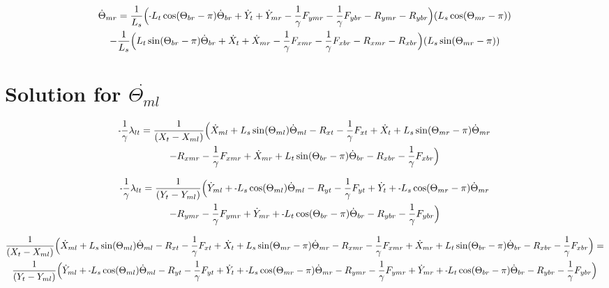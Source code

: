 \documentclass[11pt, landscape]{article}
\newcommand{\mn}{\scalebox{0.7}[1.0]{-}}
\begin{document}
\begin{multline}
\dot{\Theta}_{mr} =
\frac{1}{L_{s}} \Big( \mn L_{t}\cos(\Theta_{br}-\pi) \dot{\Theta}_{br} + \dot{Y}_{t }  + \dot{Y}_{mr} - \frac{1}{\gamma}F_{ymr} - \frac{1}{\gamma}F_{ybr} - R_{ymr} - R_{ybr} \Big) (L_{s}\cos(\Theta_{mr}-\pi))\\
  - \frac{1}{L_{s}}\Big(L_{t}\sin(\Theta_{br}-\pi) \dot{\Theta}_{br} + \dot{X}_{t } + \dot{X}_{mr} - \frac{1}{\gamma}F_{xmr} - \frac{1}{\gamma}F_{xbr} - R_{xmr} - R_{xbr} \Big)(L_{s}\sin(\Theta_{mr}-\pi))
\end{multline}



\section{Solution for $\dot{\Theta_{ml}}$}

\begin{multline}
\mn\frac{1}{\gamma}\lambda_{lt} =
\frac{1}{(X_{t } - X_{ml})} \Big( \dot{X}_{ml} + L_{s}\sin(\Theta_{ml})      \dot{\Theta}_{ml} - R_{xt } - \frac{1}{\gamma}F_{xt } + \dot{X}_{t } + L_{s}\sin(\Theta_{mr}-\pi)  \dot{\Theta}_{mr} \\
- R_{xmr} - \frac{1}{\gamma}F_{xmr} + \dot{X}_{mr} + L_{t}\sin(\Theta_{br}-\pi)  \dot{\Theta}_{br} - R_{xbr} - \frac{1}{\gamma}F_{xbr} \Big)
\end{multline}

\begin{multline}
\mn\frac{1}{\gamma}\lambda_{lt} =
\frac{1}{(Y_{t } - Y_{ml})} \Big( \dot{Y}_{ml} + \mn L_{s}\cos(\Theta_{ml})      \dot{\Theta}_{ml} - R_{yt} - \frac{1}{\gamma}F_{yt } + \dot{Y}_{t } + \mn L_{s}\cos(\Theta_{mr}-\pi)  \dot{\Theta}_{mr} \\
- R_{ymr} - \frac{1}{\gamma}F_{ymr} + \dot{Y}_{mr} + \mn L_{t}\cos(\Theta_{br}-\pi)  \dot{\Theta}_{br} - R_{ybr} - \frac{1}{\gamma}F_{ybr}\Big)
\end{multline}

\begin{multline}
\frac{1}{(X_{t } - X_{ml})} \Big( \dot{X}_{ml} + L_{s}\sin(\Theta_{ml})      \dot{\Theta}_{ml} - R_{xt } - \frac{1}{\gamma}F_{xt } + \dot{X}_{t } + L_{s}\sin(\Theta_{mr}-\pi)  \dot{\Theta}_{mr}
- R_{xmr} - \frac{1}{\gamma}F_{xmr} + \dot{X}_{mr} + L_{t}\sin(\Theta_{br}-\pi)  \dot{\Theta}_{br} - R_{xbr} - \frac{1}{\gamma}F_{xbr} \Big) = \\
\frac{1}{(Y_{t } - Y_{ml})} \Big( \dot{Y}_{ml} + \mn L_{s}\cos(\Theta_{ml})      \dot{\Theta}_{ml} - R_{yt} - \frac{1}{\gamma}F_{yt } + \dot{Y}_{t } + \mn L_{s}\cos(\Theta_{mr}-\pi)  \dot{\Theta}_{mr}
- R_{ymr} - \frac{1}{\gamma}F_{ymr} + \dot{Y}_{mr} + \mn L_{t}\cos(\Theta_{br}-\pi)  \dot{\Theta}_{br} - R_{ybr} - \frac{1}{\gamma}F_{ybr}\Big)
\end{multline}
\end{document}
